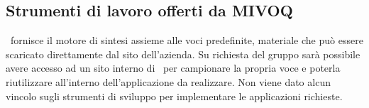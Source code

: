 \subsection{Strumenti di lavoro offerti da MIVOQ}
\AZIENDA\ fornisce il motore di sintesi assieme alle voci predefinite, materiale
che può essere scaricato direttamente dal sito dell’azienda. Su richiesta del 
gruppo sarà possibile avere accesso ad un sito interno di \AZIENDA\ per 
campionare la propria voce e poterla riutilizzare all'interno dell’applicazione 
da realizzare. Non viene dato alcun vincolo sugli strumenti di sviluppo per 
implementare le applicazioni richieste.

\newpage

